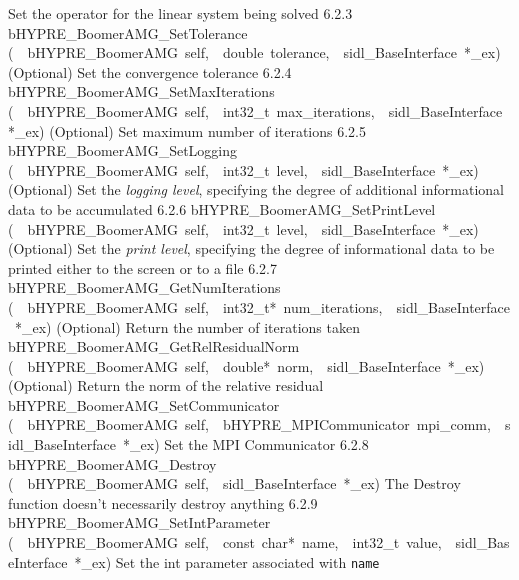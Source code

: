 \documentclass{article}
\begin{document}
\begin{cxxentry}
\begin{cxxentry}
\begin{cxxnames}
        {
Set the operator for the linear system being solved}
        {6.2.3}
        {bHYPRE\_BoomerAMG\_SetTolerance}
        {(\ \ bHYPRE\_BoomerAMG\ self,\ \ double\ tolerance,\ \ sidl\_BaseInterface\ *\_ex)}
        {
(Optional) Set the convergence tolerance}
        {6.2.4}
        {bHYPRE\_BoomerAMG\_SetMaxIterations}
        {(\ \ bHYPRE\_BoomerAMG\ self,\ \ int32\_t\ max\_iterations,\ \ sidl\_BaseInterface\ *\_ex)}
        {
(Optional) Set maximum number of iterations}
        {6.2.5}
        {bHYPRE\_BoomerAMG\_SetLogging}
        {(\ \ bHYPRE\_BoomerAMG\ self,\ \ int32\_t\ level,\ \ sidl\_BaseInterface\ *\_ex)}
        {
(Optional) Set the {\it logging level}, specifying the degree
of additional informational data to be accumulated}
        {6.2.6}
        {bHYPRE\_BoomerAMG\_SetPrintLevel}
        {(\ \ bHYPRE\_BoomerAMG\ self,\ \ int32\_t\ level,\ \ sidl\_BaseInterface\ *\_ex)}
        {
(Optional) Set the {\it print level}, specifying the degree
of informational data to be printed either to the screen or
to a file}
        {6.2.7}
        {bHYPRE\_BoomerAMG\_GetNumIterations}
        {(\ \ bHYPRE\_BoomerAMG\ self,\ \ int32\_t*\ num\_iterations,\ \ sidl\_BaseInterface\ *\_ex)}
        {
(Optional) Return the number of iterations taken}
        {}
\label{cxx.6.2.17}
        {bHYPRE\_BoomerAMG\_GetRelResidualNorm}
        {(\ \ bHYPRE\_BoomerAMG\ self,\ \ double*\ norm,\ \ sidl\_BaseInterface\ *\_ex)}
        {
(Optional) Return the norm of the relative residual}
        {}
\label{cxx.6.2.18}
        {bHYPRE\_BoomerAMG\_SetCommunicator}
        {(\ \ bHYPRE\_BoomerAMG\ self,\ \ bHYPRE\_MPICommunicator\ mpi\_comm,\ \ sidl\_BaseInterface\ *\_ex)}
        {
Set the MPI Communicator}
        {6.2.8}
        {bHYPRE\_BoomerAMG\_Destroy}
        {(\ \ bHYPRE\_BoomerAMG\ self,\ \ sidl\_BaseInterface\ *\_ex)}
        {
The Destroy function doesn't necessarily destroy anything}
        {6.2.9}
        {bHYPRE\_BoomerAMG\_SetIntParameter}
        {(\ \ bHYPRE\_BoomerAMG\ self,\ \ const\ char*\ name,\ \ int32\_t\ value,\ \ sidl\_BaseInterface\ *\_ex)}
        {
Set the int parameter associated with {\tt name}}
        {}
\label{cxx.6.2.19}

\end{cxxnames}
\end{cxxentry}
\end{cxxentry}
\end{document}
